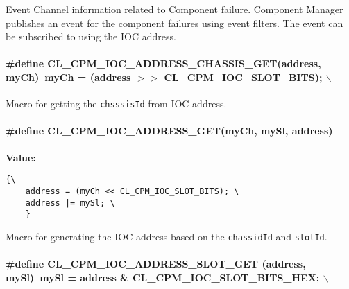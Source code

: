 Event Channel information related to Component failure. Component Manager publishes an event for the component failures using event filters. 
The event can be subscribed to using the IOC address. \hypertarget{group__group14_ga63}{
\paragraph[CL\_\-CPM\_\-IOC\_\-ADDRESS\_\-CHASSIS\_\-GET]{\setlength{\rightskip}{0pt plus 5cm}\#define CL\_\-CPM\_\-IOC\_\-ADDRESS\_\-CHASSIS\_\-GET(address, my\-Ch)~my\-Ch = (address $>$$>$ CL\_\-CPM\_\-IOC\_\-SLOT\_\-BITS); $\backslash$}\hfill}
\label{group__group14_ga63}


Macro for getting the {\tt {chsssis\-Id}} from IOC address. \hypertarget{group__group14_ga61}{
\paragraph[CL\_\-CPM\_\-IOC\_\-ADDRESS\_\-GET]{\setlength{\rightskip}{0pt plus 5cm}\#define CL\_\-CPM\_\-IOC\_\-ADDRESS\_\-GET(my\-Ch, my\-Sl, address)}\hfill}
\label{group__group14_ga61}


{\bf Value:}

\footnotesize\begin{verbatim}{\
    address = (myCh << CL_CPM_IOC_SLOT_BITS); \
    address |= mySl; \
    }
\end{verbatim}\normalsize 
Macro for generating the IOC address based on the {\tt {chassid\-Id}} and {\tt {slot\-Id}}. \hypertarget{group__group14_ga62}{
\paragraph[CL\_\-CPM\_\-IOC\_\-ADDRESS\_\-SLOT\_\-GET]{\setlength{\rightskip}{0pt plus 5cm}\#define CL\_\-CPM\_\-IOC\_\-ADDRESS\_\-SLOT\_\-GET
(address, my\-Sl)~my\-Sl = address \& CL\_\-CPM\_\-IOC\_\-SLOT\_\-BITS\_\-HEX; $\backslash$}\hfill}
\label{group__group14_ga62}



